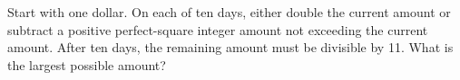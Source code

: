 Start with one dollar. On each of ten days, either double the current amount or subtract a positive perfect-square integer amount not exceeding the current amount. After ten days, the remaining amount must be divisible by 11. What is the largest possible amount?
